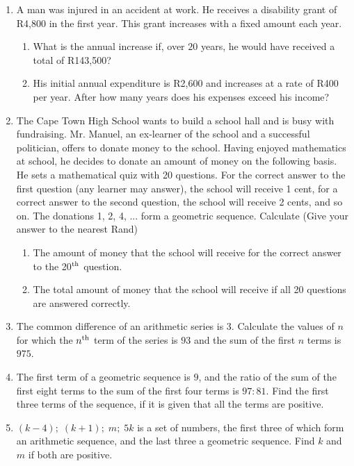 \begin{enumerate}
\item A man was injured in an accident at work. He receives a disability grant of R4,800 in the first year. This grant increases with a fixed amount each year.
\begin{enumerate}
\item What is the annual increase if, over $20$ years, he would have received a total of R143,500?
\item His initial annual expenditure is R2,600 and increases at a rate of R400 per year. After how many years does his expenses exceed his income?
\end{enumerate}
\item{The Cape Town High School wants to build a school hall and is busy with fundraising. Mr. Manuel, an ex-learner of the school and a successful politician, offers to donate money to the school. Having enjoyed mathematics at school, he decides to donate an amount of money on the following basis.
He sets a mathematical quiz with 20 questions. For the correct answer to the first question (any learner may answer), the school will receive 1 cent, for a correct answer to the second question, the school will receive 2 cents, and so on. The donations 1, 2, 4, ... form a geometric sequence. Calculate (Give your answer to the nearest Rand)
\begin{enumerate}
\item{The amount of money that the school will receive for the correct answer to the 20$^{\rm{th}}$ question.}
\item{The total amount of money that the school will receive if all 20 questions are answered correctly.}
\end{enumerate}
}\item{ The common difference of an arithmetic series is 3. Calculate the values of $n$ for which the $n^{\rm{th}}$ term of the series is $93$ and the sum of the first $n$ terms is $975$.}

\item{The first term of a geometric sequence is $9$, and the ratio of the sum of the first eight terms to the sum of the first four terms is $97:81$. Find the first three terms of the sequence, if it is given that all the terms are positive.}

\item{$(k-4); \; (k+1); \; m; \; 5k$ is a set of numbers, the first three of which form an arithmetic sequence, and the last three a geometric sequence. Find $k$ and $m$ if both are positive.}


\end{enumerate}
